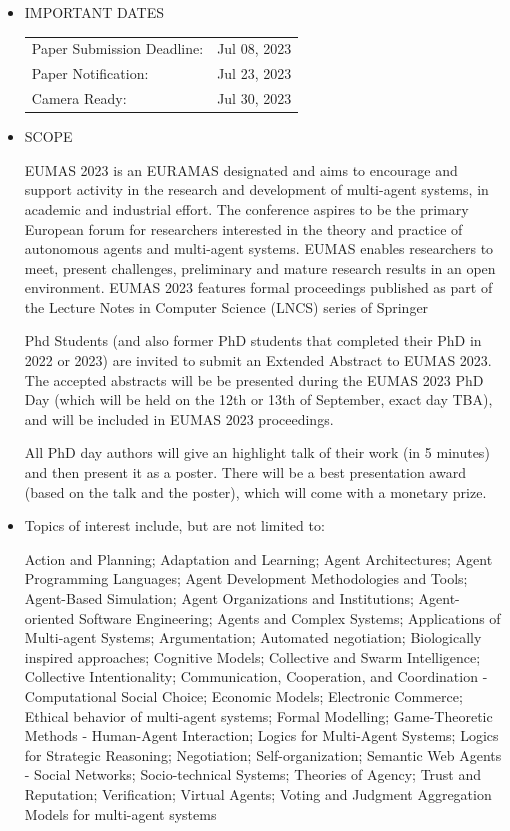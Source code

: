 \documentclass[prodmode,acmtecs]{acmsmall} %
\begin{document}
\begin{itemize}\item  IMPORTANT DATES 
 
\begin{tabulary}{\linewidth}{LL}Paper Submission Deadline:  & Jul 08, 2023 \\
Paper Notification:  & Jul 23, 2023 \\
Camera Ready:  & Jul 30, 2023 \\
\end{tabulary}
 
\item  SCOPE 
 
  EUMAS 2023 is an EURAMAS designated and aims to encourage and support activity in the research and development of multi-agent systems, in academic and industrial effort. The conference aspires to be the primary European forum for researchers interested in the theory and practice of autonomous agents and multi-agent systems. EUMAS enables researchers to meet, present challenges, preliminary and mature research results in an open environment. EUMAS 2023 features formal proceedings published as part of the Lecture Notes in Computer Science (LNCS) series of Springer 
 
  Phd Students (and also former PhD students that completed their PhD in 2022 or 2023) are invited to submit an Extended Abstract to EUMAS 2023. The accepted abstracts will be be presented during the EUMAS 2023 PhD Day (which will be held on the 12th or 13th of September, exact day TBA), and will be included in EUMAS 2023 proceedings. 
 
  All PhD day authors will give an highlight talk of their work (in 5 minutes) and then present it as a poster. There will be a best presentation award (based on the talk and the poster), which will come with a monetary prize. 
 
\item  Topics of interest include, but are not limited to: 
 
   Action and Planning; Adaptation and Learning; Agent Architectures; Agent Programming Languages; Agent Development Methodologies and Tools; Agent-Based Simulation; Agent Organizations and Institutions; Agent-oriented Software Engineering; Agents and Complex Systems; Applications of Multi-agent Systems; Argumentation; Automated negotiation; Biologically inspired approaches; Cognitive Models; Collective and Swarm Intelligence; Collective Intentionality; Communication, Cooperation, and Coordination - Computational Social Choice; Economic Models; Electronic Commerce; Ethical behavior of multi-agent systems; Formal Modelling; Game-Theoretic Methods - Human-Agent Interaction; Logics for Multi-Agent Systems; Logics for Strategic Reasoning; Negotiation; Self-organization; Semantic Web Agents - Social Networks; Socio-technical Systems; Theories of Agency; Trust and Reputation; Verification; Virtual Agents; Voting and Judgment Aggregation Models for multi-agent systems 
 

\end{itemize}
\end{document}
